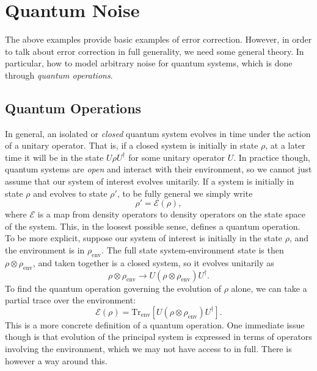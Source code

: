 \documentclass[12pt,a4paper]{report}
\numberwithin{equation}{section}
\theoremstyle{definition}
\theoremstyle{theorem}
\theoremstyle{theorem}
\theoremstyle{example}
\theoremstyle{definition}
\begin{document}
\section{Quantum Noise}
The above examples provide basic examples of error correction. However, in order to talk about error correction in full generality, we need some general theory. In particular, how to model arbitrary noise for quantum systems, which is done through \textit{quantum operations}.
\subsection{Quantum Operations}
In general, an isolated or \textit{closed} quantum system evolves in time under the action of a unitary operator. That is, if a closed system is initially in state $\rho$, at a later time it will be in the state $U\rho U^{\dagger}$ for some unitary operator $U$. In practice though, quantum systems are \textit{open} and interact with their environment, so we cannot just assume that our system of interest evolves unitarily. If a system is initially in state $\rho$ and evolves to state $\rho'$, to be fully general we simply write
\begin{equation}
	\rho'=\mathcal{E}(\rho),
\end{equation}
where $\mathcal{E}$ is a map from density operators to density operators on the state space of the system. This, in the loosest possible sense, defines a quantum operation.\\
To be more explicit, suppose our system of interest is initially in the state $\rho$, and the environment is in $\rho_{\text{env}}$. The full state system-environment state is then $\rho\otimes\rho_{\text{env}}$, and taken together is a closed system, so it evolves unitarily as 
\begin{equation}
	\rho\otimes\rho_{\text{env}}\to U\left(\rho\otimes\rho_{\text{env}}\right)U^{\dagger}.
\end{equation}
To find the quantum operation governing the evolution of $\rho$ alone, we can take a partial trace over the environment:
\begin{equation}\label{qop}
	\mathcal{E}(\rho)=\text{Tr}_{\text{env}}\left[U(\rho\otimes\rho_{\text{env}})U^{\dagger}\right].
\end{equation}
This is a more concrete definition of a quantum operation. One immediate issue though is that evolution of the principal system is expressed in terms of operators involving the environment, which we may not have access to in full. There is however a way around this.
\end{document}
